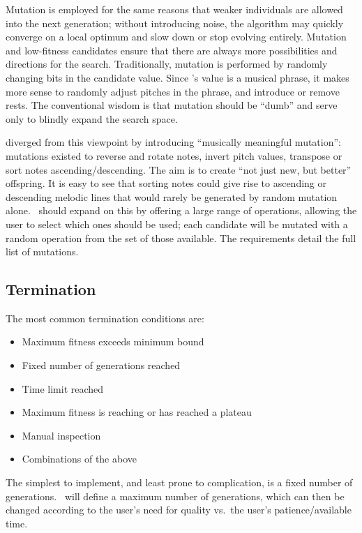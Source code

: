 Mutation is employed for the same reasons that weaker individuals are allowed into the next generation; without introducing noise, the algorithm may quickly converge on a local optimum and slow down or stop evolving entirely. Mutation and low-fitness candidates ensure that there are always more possibilities and directions for the search. Traditionally, mutation is performed by randomly changing bits in the candidate value. Since \jg's value is a musical phrase, it makes more sense to randomly adjust pitches in the phrase, and introduce or remove rests. The conventional wisdom is that mutation should be ``dumb'' and serve only to blindly expand the search space.

\cite{biles94} diverged from this viewpoint by introducing ``musically meaningful mutation'': mutations existed to reverse and rotate notes, invert pitch values, transpose or sort notes ascending/descending. The aim is to create ``not just new, but better'' offspring. It is easy to see that sorting notes could give rise to ascending or descending melodic lines that would rarely be generated by random mutation alone. \jg\ should expand on this by offering a large range of operations, allowing the user to select which ones should be used; each candidate will be mutated with a random operation from the set of those available. The requirements detail the full list of mutations.

\subsection{Termination}

The most common termination conditions are:

\begin{itemize}
\item Maximum fitness exceeds minimum bound
\item Fixed number of generations reached
\item Time limit reached
\item Maximum fitness is reaching or has reached a plateau
\item Manual inspection
\item Combinations of the above
\end{itemize}

The simplest to implement, and least prone to complication, is a fixed number of generations. \jg\ will define a maximum number of generations, which can then be changed according to the user's need for quality vs.\ the user's patience/available time.

